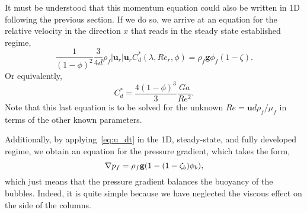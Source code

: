 It must be understood that this momentum equation could also be written in 1D following the previous section. 
If we do so, we arrive at an equation for the relative velocity in the direction $x$ that reads in the steady state established regime, 
\begin{equation}
    \frac{1}{(1-\phi)^2} \frac{3}{4d}\rho_f |\textbf{u}_r| \textbf{u}_r  C_d^*(\lambda,Re_{r},\phi)
    = 
    \rho_f \textbf{g} \phi_f (1-\zeta).
\end{equation}
Or equivalently, 
\begin{equation}
    C_d^* = \frac{4(1-\phi)^3}{3}\frac{Ga}{Re^2}.
\end{equation}
Note that this last equation is to be solved for the unknown $Re = \textbf{u} d\rho_f / \mu_f $ in terms of the other known parameters. 


Additionally, by applying~\ref{eq:u_dt} in the 1D, steady-state, and fully developed regime, we obtain an equation for the pressure gradient, which takes the form,
\begin{equation}
    \mathbf{\nabla} p_f
    = 
    \rho_f \textbf{g} (1 - (1-\zeta_b) \phi_b),
\end{equation}
which just means that the pressure gradient balances the buoyancy of the bubbles.
Indeed, it is quite simple because we have neglected the viscous effect on the side of the columns. 



      


